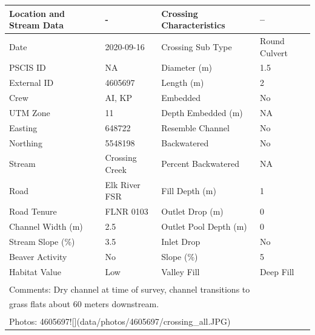 \documentclass[
]{book}
\begin{document}
\begin{tabular}{l|l|l|l}
\hline
Location and Stream Data & - & Crossing Characteristics & --\\
\hline
Date & 2020-09-16 & Crossing Sub Type & Round Culvert\\
\hline
PSCIS ID & NA & Diameter (m) & 1.5\\
\hline
External ID & 4605697 & Length (m) & 2\\
\hline
Crew & AI, KP & Embedded & No\\
\hline
UTM Zone & 11 & Depth Embedded (m) & NA\\
\hline
Easting & 648722 & Resemble Channel & No\\
\hline
Northing & 5548198 & Backwatered & No\\
\hline
Stream & Crossing Creek & Percent Backwatered & NA\\
\hline
Road & Elk River FSR & Fill Depth (m) & 1\\
\hline
Road Tenure & FLNR 0103 & Outlet Drop (m) & 0\\
\hline
Channel Width (m) & 2.5 & Outlet Pool Depth (m) & 0\\
\hline
Stream Slope (\%) & 3.5 & Inlet Drop & No\\
\hline
Beaver Activity & No & Slope (\%) & 5\\
\hline
Habitat Value & Low & Valley Fill & Deep Fill\\
\hline
\multicolumn{4}{l}{\textsuperscript{} Comments: Dry channel at time of survey, channel transitions to}\\
\multicolumn{4}{l}{grass flats about 60 meters downstream.}\\
\multicolumn{4}{l}{\textsuperscript{} Photos: 4605697![](data/photos/4605697/crossing\_all.JPG)}\\
\end{tabular}
\end{document}
